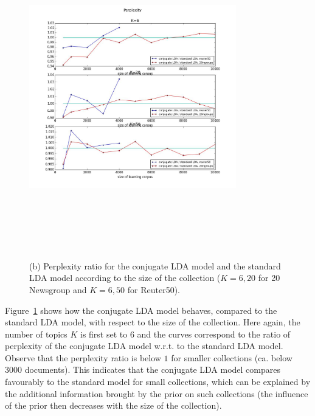 \begin{figure}[ht]
\includegraphics[width=9cm, height=14cm]{results/pp_D}
\caption{(b) \label{fig:pp-size}Perplexity ratio for the conjugate LDA model and the standard LDA model according to the size of the collection ($K=6,20$ for 20 Newsgroup and $K=6,50$ for Reuter50).}
\end{figure}
Figure~\ref{fig:pp-size} shows how the conjugate LDA model behaves, compared to the standard LDA model, with respect to the size of the collection. Here again, the number of topics $K$ is first set to $6$ and the curves correspond to the ratio of perplexity of the conjugate LDA model w.r.t. to the standard LDA model. Observe that the perplexity ratio is below $1$ for smaller collections (ca. below 3000 documents). This indicates that the conjugate LDA model compares favourably to the standard model for small collections, which can be explained by the additional information brought by the prior on such collections (the influence of the prior then decreases with the size of the collection).

